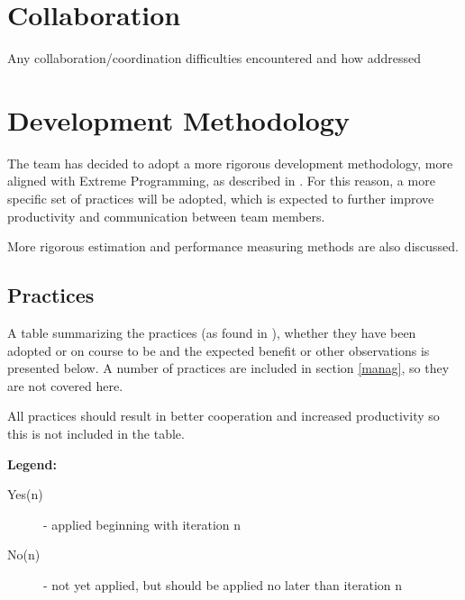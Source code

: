 \documentclass[10pt]{report}
\begin{document}
\section{Collaboration}
Any collaboration/coordination difficulties encountered and how addressed 

\section{Development Methodology}

The team has decided to adopt a more rigorous development methodology, more aligned with Extreme Programming, as described in \cite{extremep}.
For this reason, a more specific set of practices will be adopted, which is expected to further improve productivity and communication between team members.

More rigorous estimation and performance measuring methods are also discussed.

\subsection{Practices}

A table summarizing the practices (as found in \cite{extremep}), whether they have been adopted or on course to be and the expected benefit or other observations is presented below. A number of practices are included in section \ref{manag}, so they are not covered here.

All practices should result in better cooperation and increased productivity so this is not included in the table.

{\bf Legend:}
\begin{description}
\item [Yes(n)] - applied beginning with iteration n 
\item [No(n)] - not yet applied, but should be applied no later than iteration n 
\end{description}
\end{document}

